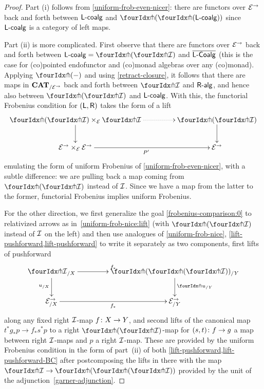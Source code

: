 \documentclass[reqno,10pt,a4paper,oneside,draft]{amsart}
\begin{document}
{\begin{proof}
Part (i) follows from \cref{uniform-frob-even-nicer}: there are functors over $\cal{E}^\to$ back and forth between $\pcoalg{\LL}$ and $\liftl{(\liftr{(\pcoalg{\LL})})}$ since $\pcoalg{\LL}$ is a category of left maps.

Part (ii) is more complicated.
First observe that there are functors over $\cal{E}^\to$ back and forth between $\pcoalg{\LL} = \liftl{(\liftr{\cal{I}})}$ and $\overline{\pCoalg{\LL}}$ (this is the case for (co)pointed endofunctor and (co)monad algebras over any (co)monad).
Applying $\liftr{(-)}$ and using \cref{retract-closure}, it follows that there are maps in $\CAT_{/\cal{E}^\to}$ back and forth between $\liftr{\cal{I}}$ and $\palg{\RR}$, and hence also between $\liftl{(\liftr{\cal{I}})}$ and $\pcoalg{\LL}$.
With this, the functorial Frobenius condition for $(\LL, \RR)$ takes the form of a lift
\begin{equation} \label{frobenius-comparison:0}
\begin{gathered}
\xymatrix@C+2em{
  \liftl{(\liftr{\cal{I}})} \times_{\cal{E}} \liftr{\cal{I}}
  \ar@{.>}[r]
  \ar[d]
&
  \liftl{(\liftr{\cal{I}})}
  \ar[d]
\\
  \cal{E}^\to \times_{\cal{E}} \cal{E}^\to
  \ar[r]_{P'}
&
  \cal{E}^\to
}
\end{gathered}
\end{equation}
emulating the form of uniform Frobenius of \cref{uniform-frob-even-nicer}, with a subtle difference: we are pulling back a map coming from $\liftl{(\liftr{\cal{I}})}$ instead of $\cal{I}$.
Since we have a map from the latter to the former, functorial Frobenius implies uniform Frobenius.

For the other direction, we first generalize the goal \eqref{frobenius-comparison:0} to relativized arrows as in~\eqref{uniform-frob-nice:lift} (with $\liftl{(\liftr{\cal{I}})}$ instead of $\cal{I}$ on the left) and then use analogues of \cref{uniform-frob-nice}, \cref{lift-pushforward,lift-pushforward} to write it separately as two components, first lifts of pushforward
\[
\xymatrix@C=1.5cm{
  {\liftr{\cal{I}}}_{/X}
  \ar[r]^{f_*}
  \ar[d]_{u_{/X}}
&
  \liftr{(\liftl{({\liftr{\cal{I}}})})}_{/Y}
  \ar[d]^{{\liftr{u}}_{/Y}}
\\
  \catE_{/X}^\to
  \ar[r]_{f_*}
&
  \catE_{/Y}^\to
}
\]
along any fixed right $\cal{I}$-map $f \co X \to Y$, and second lifts of the canonical map $t^* g_* p \to f_* s^* p$ to a right $\liftl{(\liftr{\cal{I}})}$-map for $(s, t) \co f \to g$ a map between right $\cal{I}$-maps and $p$ a right $\cal{I}$-map.
These are provided by the uniform Frobenius condition in the form of part~(ii) of both \cref{lift-pushforward,lift-pushforward-BC} after postcomposing the lifts in there with the map $\liftr{\cal{I}} \to \liftr{(\liftl{(\liftr{\cal{I}})})}$ provided by the unit of the adjunction~\eqref{garner-adjunction}.
\end{proof}
}
\end{document}
